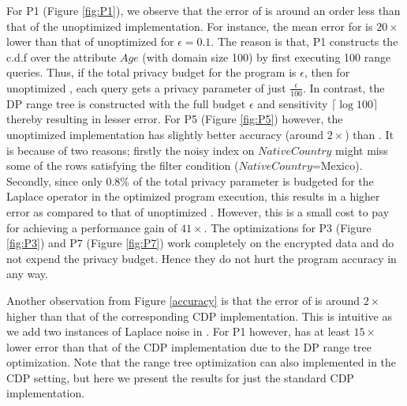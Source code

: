 For P1 (Figure \ref{fig:P1}), we observe that the error of \system is around an order less than that of the unoptimized implementation. For instance, the mean error for \system is $20\times$ lower than that of unoptimized \system for $\epsilon=0.1$.  The reason is that, P1 constructs the c.d.f over the attribute $Age$ (with domain size 100) by first executing 100 range queries. %
Thus, if the total privacy budget for the program is $\epsilon$, then for unoptimized \system, each query gets a privacy parameter of just $\frac{\epsilon}{100}$. In contrast, the DP range tree is constructed with the full budget $\epsilon$ and sensitivity $\lceil\log 100\rceil$ thereby resulting in lesser error. For P5 (Figure \ref{fig:P5}) however, the unoptimized implementation has slightly better accuracy (around $2\times$) than \system. It is because of two reasons; firstly the noisy index on $NativeCountry$ might miss some of the rows satisfying the filter condition ($NativeCountry$=Mexico). Secondly, since only 0.8\% of the total privacy parameter is budgeted for the \textsf{Laplace} operator in the optimized program execution, this results in a higher error as compared to that of unoptimized \system. However, this is a small  cost to pay for achieving a performance gain of $41\times$. The optimizations for P3 (Figure \ref{fig:P3}) and P7 (Figure \ref{fig:P7}) work completely on the encrypted data and do not expend the privacy budget. Hence they do not hurt the program accuracy in any way.
 
 Another observation from Figure \ref{accuracy} is that the error of \system is around $2\times$ higher than that of the corresponding \textsf{CDP} implementation. This is intuitive as we add two instances of Laplace noise in \system. %
 For P1 however, \system has at least $15\times$ lower error than that of the \textsf{CDP} implementation due to the DP range tree optimization. Note that the range tree optimization can also implemented in the \textsf{CDP} setting, but here we present the results for just the standard \textsf{CDP} implementation.
